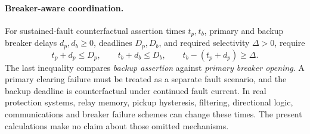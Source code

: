 \paragraph{Breaker-aware coordination.}
For sustained-fault counterfactual assertion times \(t_p,t_b\), primary and backup breaker delays \(d_p,d_b\ge0\), deadlines \(D_p,D_b\), and required selectivity \(\Delta>0\), require
\[
t_p+d_p\le D_p,\qquad t_b+d_b\le D_b,\qquad
t_b-(t_p+d_p)\ge\Delta.
\]
The last inequality compares \emph{backup assertion} against \emph{primary breaker opening}. A primary clearing failure must be treated as a separate fault scenario, and the backup deadline is counterfactual under continued fault current. In real protection systems, relay memory, pickup hysteresis, filtering, directional logic, communications and breaker failure schemes can change these times. The present calculations make no claim about those omitted mechanisms.

